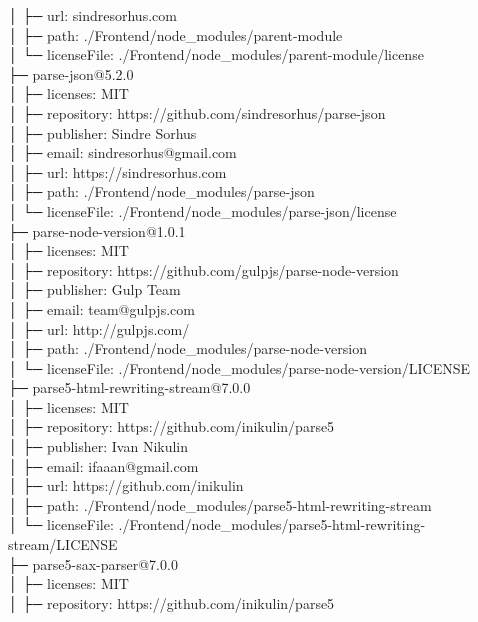 \documentclass[
    paper=a4,
    twoside=false,
    parskip=half,
    listof=entryprefix,
    listof=totoc,
    index=totoc,
    bibliography=totoc,
    headsepline,
]{scrbook}
\begin{document}
    │  ├─ url: sindresorhus.com\\
    │  ├─ path: ./Frontend/node\_modules/parent-module\\
    │  └─ licenseFile: ./Frontend/node\_modules/parent-module/license\\
    ├─ parse-json@5.2.0\\
    │  ├─ licenses: MIT\\
    │  ├─ repository: https://github.com/sindresorhus/parse-json\\
    │  ├─ publisher: Sindre Sorhus\\
    │  ├─ email: sindresorhus@gmail.com\\
    │  ├─ url: https://sindresorhus.com\\
    │  ├─ path: ./Frontend/node\_modules/parse-json\\
    │  └─ licenseFile: ./Frontend/node\_modules/parse-json/license\\
    ├─ parse-node-version@1.0.1\\
    │  ├─ licenses: MIT\\
    │  ├─ repository: https://github.com/gulpjs/parse-node-version\\
    │  ├─ publisher: Gulp Team\\
    │  ├─ email: team@gulpjs.com\\
    │  ├─ url: http://gulpjs.com/\\
    │  ├─ path: ./Frontend/node\_modules/parse-node-version\\
    │  └─ licenseFile: ./Frontend/node\_modules/parse-node-version/LICENSE\\
    ├─ parse5-html-rewriting-stream@7.0.0\\
    │  ├─ licenses: MIT\\
    │  ├─ repository: https://github.com/inikulin/parse5\\
    │  ├─ publisher: Ivan Nikulin\\
    │  ├─ email: ifaaan@gmail.com\\
    │  ├─ url: https://github.com/inikulin\\
    │  ├─ path: ./Frontend/node\_modules/parse5-html-rewriting-stream\\
    │  └─ licenseFile: ./Frontend/node\_modules/parse5-html-rewriting-stream/LICENSE\\
    ├─ parse5-sax-parser@7.0.0\\
    │  ├─ licenses: MIT\\
    │  ├─ repository: https://github.com/inikulin/parse5\\
\end{document}
